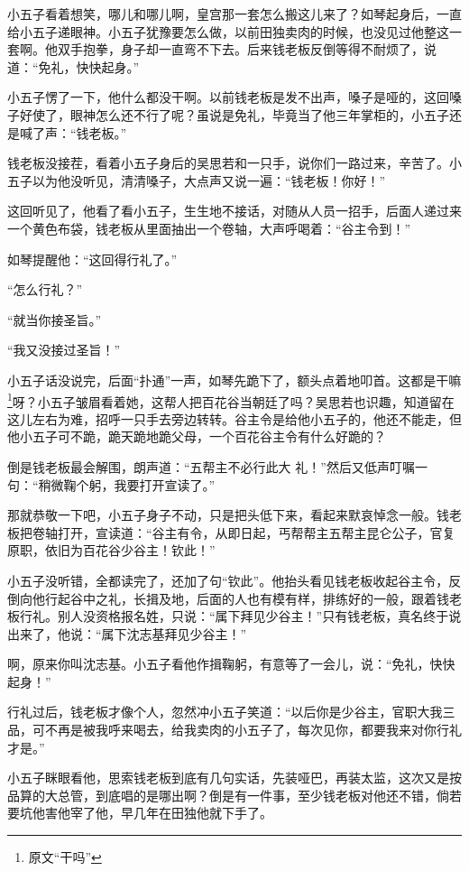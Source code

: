 小五子看着想笑，哪儿和哪儿啊，皇宫那一套怎么搬这儿来了？如琴起身后，一直给小五子递眼神。小五子犹豫要怎么做，以前田独卖肉的时候，也没见过他整这一套啊。他双手抱拳，身子却一直弯不下去。后来钱老板反倒等得不耐烦了，说道：“免礼，快快起身。”

小五子愣了一下，他什么都没干啊。以前钱老板是发不出声，嗓子是哑的，这回嗓子好使了，眼神怎么还不行了呢？虽说是免礼，毕竟当了他三年掌柜的，小五子还是喊了声：“钱老板。”

钱老板没接茬，看着小五子身后的吴思若和一只手，说你们一路过来，辛苦了。小五子以为他没听见，清清嗓子，大点声又说一遍：“钱老板！你好！”

这回听见了，他看了看小五子，生生地不接话，对随从人员一招手，后面人递过来一个黄色布袋，钱老板从里面抽出一个卷轴，大声呼喝着：“谷主令到！”

如琴提醒他：“这回得行礼了。”

“怎么行礼？”

“就当你接圣旨。”

“我又没接过圣旨！”

小五子话没说完，后面“扑通”一声，如琴先跪下了，额头点着地叩首。这都是干嘛\footnote{原文“干吗”}呀？小五子皱眉看着她，这帮人把百花谷当朝廷了吗？吴思若也识趣，知道留在这儿左右为难，招呼一只手去旁边转转。谷主令是给他小五子的，他还不能走，但他小五子可不跪，跪天跪地跪父母，一个百花谷主令有什么好跪的？

倒是钱老板最会解围，朗声道：“五帮主不必行此大
礼！”然后又低声叮嘱一句：“稍微鞠个躬，我要打开宣读了。”

那就恭敬一下吧，小五子身子不动，只是把头低下来，看起来默哀悼念一般。钱老板把卷轴打开，宣读道：“谷主有令，从即日起，丐帮帮主五帮主昆仑公子，官复原职，依旧为百花谷少谷主！钦此！”

小五子没听错，全都读完了，还加了句“钦此”。他抬头看见钱老板收起谷主令，反倒向他行起谷中之礼，长揖及地，后面的人也有模有样，排练好的一般，跟着钱老板行礼。别人没资格报名姓，只说：“属下拜见少谷主！”只有钱老板，真名终于说出来了，他说：“属下沈志基拜见少谷主！”

啊，原来你叫沈志基。小五子看他作揖鞠躬，有意等了一会儿，说：“免礼，快快起身！”

行礼过后，钱老板才像个人，忽然冲小五子笑道：“以后你是少谷主，官职大我三品，可不再是被我呼来喝去，给我卖肉的小五子了，每次见你，都要我来对你行礼才是。”

小五子眯眼看他，思索钱老板到底有几句实话，先装哑巴，再装太监，这次又是按品算的大总管，到底唱的是哪出啊？倒是有一件事，至少钱老板对他还不错，倘若要坑他害他宰了他，早几年在田独他就下手了。

